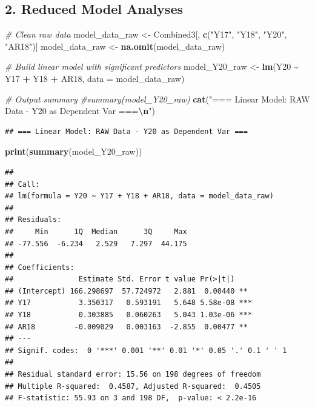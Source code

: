 \documentclass[
]{article}
\newenvironment{Shaded}{\begin{snugshade}}{\end{snugshade}}
\newcommand{\AttributeTok}[1]{\textcolor[rgb]{0.13,0.29,0.53}{#1}}
\newcommand{\CommentTok}[1]{\textcolor[rgb]{0.56,0.35,0.01}{\textit{#1}}}
\newcommand{\FunctionTok}[1]{\textcolor[rgb]{0.13,0.29,0.53}{\textbf{#1}}}
\newcommand{\NormalTok}[1]{#1}
\newcommand{\OtherTok}[1]{\textcolor[rgb]{0.56,0.35,0.01}{#1}}
\newcommand{\SpecialCharTok}[1]{\textcolor[rgb]{0.81,0.36,0.00}{\textbf{#1}}}
\newcommand{\StringTok}[1]{\textcolor[rgb]{0.31,0.60,0.02}{#1}}
\begin{document}
\subsection{2. Reduced Model Analyses}\label{reduced-model-analyses}

\begin{Shaded}
\begin{Highlighting}[]
\CommentTok{\# Clean raw data}
\NormalTok{model\_data\_raw }\OtherTok{\textless{}{-}}\NormalTok{ Combined3[, }\FunctionTok{c}\NormalTok{(}\StringTok{"Y17"}\NormalTok{, }\StringTok{"Y18"}\NormalTok{, }\StringTok{"Y20"}\NormalTok{, }\StringTok{"AR18"}\NormalTok{)]}
\NormalTok{model\_data\_raw }\OtherTok{\textless{}{-}} \FunctionTok{na.omit}\NormalTok{(model\_data\_raw)}

\CommentTok{\# Build linear model with significant predictors}
\NormalTok{model\_Y20\_raw }\OtherTok{\textless{}{-}} \FunctionTok{lm}\NormalTok{(Y20 }\SpecialCharTok{\textasciitilde{}}\NormalTok{ Y17 }\SpecialCharTok{+}\NormalTok{ Y18 }\SpecialCharTok{+}\NormalTok{ AR18, }\AttributeTok{data =}\NormalTok{ model\_data\_raw)}

\CommentTok{\# Output summary}
\CommentTok{\#summary(model\_Y20\_raw)}
\FunctionTok{cat}\NormalTok{(}\StringTok{"=== Linear Model: RAW Data {-} Y20 as Dependent Var ===}\SpecialCharTok{\textbackslash{}n}\StringTok{"}\NormalTok{)}
\end{Highlighting}
\end{Shaded}

\begin{verbatim}
## === Linear Model: RAW Data - Y20 as Dependent Var ===
\end{verbatim}

\begin{Shaded}
\begin{Highlighting}[]
\FunctionTok{print}\NormalTok{(}\FunctionTok{summary}\NormalTok{(model\_Y20\_raw))}
\end{Highlighting}
\end{Shaded}

\begin{verbatim}
## 
## Call:
## lm(formula = Y20 ~ Y17 + Y18 + AR18, data = model_data_raw)
## 
## Residuals:
##     Min      1Q  Median      3Q     Max 
## -77.556  -6.234   2.529   7.297  44.175 
## 
## Coefficients:
##               Estimate Std. Error t value Pr(>|t|)    
## (Intercept) 166.298697  57.724972   2.881  0.00440 ** 
## Y17           3.350317   0.593191   5.648 5.58e-08 ***
## Y18           0.303885   0.060263   5.043 1.03e-06 ***
## AR18         -0.009029   0.003163  -2.855  0.00477 ** 
## ---
## Signif. codes:  0 '***' 0.001 '**' 0.01 '*' 0.05 '.' 0.1 ' ' 1
## 
## Residual standard error: 15.56 on 198 degrees of freedom
## Multiple R-squared:  0.4587, Adjusted R-squared:  0.4505 
## F-statistic: 55.93 on 3 and 198 DF,  p-value: < 2.2e-16
\end{verbatim}
\end{document}
